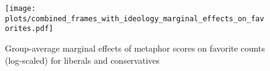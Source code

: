 \begin{figure}[htbp!]
    \centering
    \texttt{[image: plots/combined\_frames\_with\_ideology\_marginal\_effects\_on\_favorites.pdf]}
    \caption{Group-average marginal effects of metaphor scores on favorite counts (log-scaled) for liberals and conservatives }
    \label{fig:favorite-ideology}
\end{figure}









